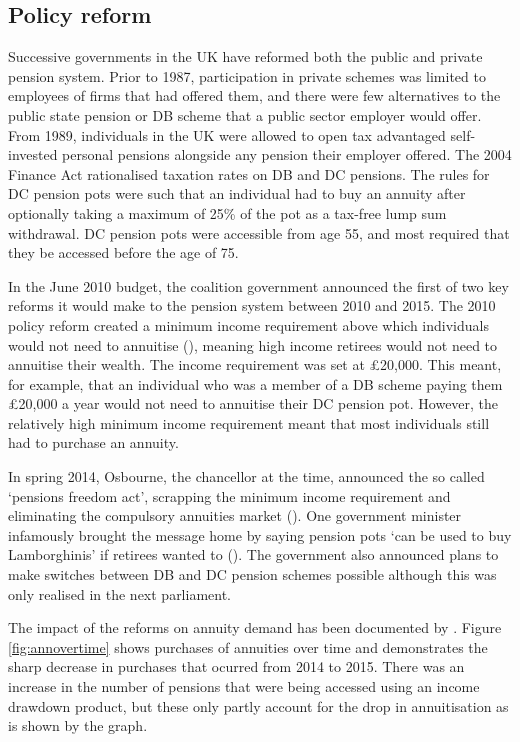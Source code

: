 \documentclass[12pt]{article}
\begin{document}
\subsection{Policy reform}

Successive governments in the UK have reformed both the public and
private pension system. Prior to 1987, participation in private schemes was
limited to employees of firms that had offered them, and there were few
alternatives to the public state pension or DB scheme that a public sector
employer would offer. From 1989, individuals in the UK were allowed to open tax
advantaged self-invested personal pensions alongside any pension their employer
offered. The 2004 Finance Act rationalised taxation rates on DB and DC pensions.
The rules for DC pension pots were such that an individual had to buy an annuity
after optionally taking a maximum of 25\% of the pot as a tax-free lump sum
withdrawal. DC pension pots were accessible from age 55, and most required that
they be accessed before the age of 75.

In the June 2010 budget, the coalition government announced the first of two key
reforms it would make to the pension system between 2010 and 2015. The 2010
policy reform created a minimum income requirement above which individuals would
not need to annuitise (\cite{finance-act-hmt-2011}), meaning high income
retirees would not need to annuitise their wealth. The income requirement was
set at £20,000. This meant, for example, that an individual who was a member of
a DB scheme paying them £20,000 a year would not need to annuitise their DC
pension pot. However, the relatively high minimum income requirement meant that
most individuals still had to purchase an annuity.

In spring 2014, Osbourne, the chancellor at the time, announced the so called
`pensions freedom act', scrapping the minimum income requirement and eliminating
the compulsory annuities market (\cite{pen-freedoms-hmt-2014}). One government
minister infamously brought the message home by saying pension pots `can be used
to buy Lamborghinis' if retirees wanted to (\cite{guardian-lambos}). The
government also announced plans to make switches between DB and DC pension
schemes possible although this was only realised in the next parliament.

The impact of the reforms on annuity demand has been documented by
\cite{cannon-et-al-nier-2016}. Figure \ref{fig:annovertime} shows
purchases of annuities over time and demonstrates the sharp decrease in purchases
that ocurred from 2014 to 2015. There was an increase in the number of pensions
that were being accessed using an income drawdown product, but these only partly
account for the drop in annuitisation as is shown by the graph.
\end{document}
